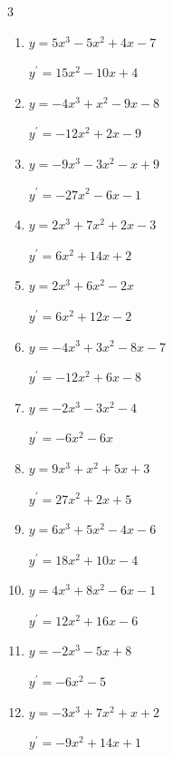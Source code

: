 \begin{multicols}{3}
\begin{enumerate}
  \item $y=5x^{3}-5x^{2}+4x-7$

        $\displaystyle y^{\prime}=15x^{2}-10x+4$

  \item $y=-4x^{3}+x^{2}-9x-8$

        $\displaystyle y^{\prime}=-12x^{2}+2x-9$

  \item $y=-9x^{3}-3x^{2}-x+9$

        $\displaystyle y^{\prime}=-27x^{2}-6x-1$

  \item $y=2x^{3}+7x^{2}+2x-3$

        $\displaystyle y^{\prime}=6x^{2}+14x+2$

  \item $y=2x^{3}+6x^{2}-2x$

        $\displaystyle y^{\prime}=6x^{2}+12x-2$

  \item $y=-4x^{3}+3x^{2}-8x-7$

        $\displaystyle y^{\prime}=-12x^{2}+6x-8$

  \item $y=-2x^{3}-3x^{2}-4$

        $\displaystyle y^{\prime}=-6x^{2}-6x$

  \item $y=9x^{3}+x^{2}+5x+3$

        $\displaystyle y^{\prime}=27x^{2}+2x+5$

  \item $y=6x^{3}+5x^{2}-4x-6$

        $\displaystyle y^{\prime}=18x^{2}+10x-4$

  \item $y=4x^{3}+8x^{2}-6x-1$

        $\displaystyle y^{\prime}=12x^{2}+16x-6$

  \item $y=-2x^{3}-5x+8$

        $\displaystyle y^{\prime}=-6x^{2}-5$

  \item $y=-3x^{3}+7x^{2}+x+2$

        $\displaystyle y^{\prime}=-9x^{2}+14x+1$

\end{enumerate}
\end{multicols}

